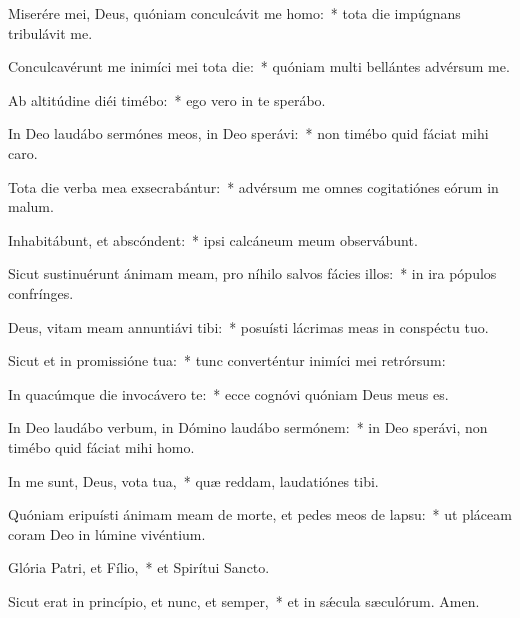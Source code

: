 \item Miserére mei, Deus, quóniam conculcávit me homo:~* tota die impúgnans tribulávit me.

\item Conculcavérunt me inimíci mei tota die:~* quóniam multi bellántes advérsum me.

\item Ab altitúdine diéi timébo:~* ego vero in te sperábo.

\item In Deo laudábo sermónes meos, in Deo sperávi:~* non timébo quid fáciat mihi caro.

\item Tota die verba mea exsecrabántur:~* advérsum me omnes cogitatiónes eórum in malum.

\item Inhabitábunt, et abscóndent:~* ipsi calcáneum meum observábunt.

\item Sicut sustinuérunt ánimam meam, pro níhilo salvos fácies illos:~* in ira pópulos confrínges.

\item Deus, vitam meam annuntiávi tibi:~* posuísti lácrimas meas in conspéctu tuo.

\item Sicut et in promissióne tua:~* tunc converténtur inimíci mei retrórsum:

\item In quacúmque die invocávero te:~* ecce cognóvi quóniam Deus meus es.

\item In Deo laudábo verbum, in Dómino laudábo sermónem:~* in Deo sperávi, non timébo quid fáciat mihi homo.

\item In me sunt, Deus, vota tua,~* quæ reddam, laudatiónes tibi.

\item Quóniam eripuísti ánimam meam de morte, et pedes meos de lapsu:~* ut pláceam coram Deo in lúmine vivéntium.

\item Glória Patri, et Fílio,~* et Spirítui Sancto.

\item Sicut erat in princípio, et nunc, et semper,~* et in sǽcula sæculórum. Amen.

